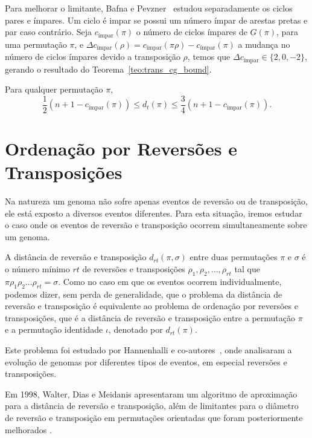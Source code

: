 Para melhorar o limitante, Bafna e Pevzner~\cite{BafnaPevzner*1998}
estudou separadamente os ciclos pares e ímpares. Um ciclo é impar se
possui um número ímpar de arestas pretas e par caso contrário. Seja
$c_{\text{ímpar}}(\pi)$ o número de ciclos ímpares de $G(\pi)$, para
uma permutação $\pi$, e $\Delta c_{\text{ímpar}} (\rho) =
c_{\text{ímpar}} (\pi \rho) - c_{\text{ímpar}} (\pi)$ a mudança no
número de ciclos ímpares devido a transposição $\rho$, temos que
$\Delta c_{\text{ímpar}} \in \{2, 0, -2\}$, gerando o resultado do
Teorema~\ref{teo:trans_cg_bound}.

\begin{teo} 
  \label{teo:trans_cg_bound} 
  Para qualquer permutação $\pi$, 
  \[ 
  \frac{1}{2}(n + 1 - c_{\text{ímpar}}(\pi)) \leq d_t(\pi) \leq \frac{3}{4} (n
  + 1 - c_{\text{ímpar}}(\pi)).
  \]
\end{teo}

\section{Ordenação por Reversões e Transposições}
\label{sec:rev_trans}
Na natureza um genoma não sofre apenas eventos de reversão ou de
transposição, ele está exposto a diversos eventos diferentes. Para
esta situação, iremos estudar o caso onde os eventos de reversão e
transposição ocorrem simultaneamente sobre um genoma.

A distância de reversão e transposição $d_{rt}(\pi, \sigma)$ entre
duas permutações $\pi$ e $\sigma$ é o número mínimo $rt$ de reversões
e transposições $\rho_{1}, \rho_{2}, \ldots, \rho_{rt}$ tal que
$\pi \rho_{1} \rho_{2} \ldots \rho_{rt} = \sigma$. Como no caso em que
os eventos ocorrem individualmente, podemos dizer, sem perda de
generalidade, que o problema da distância de reversão e transposição é
equivalente ao problema de ordenação por reversões e transposições,
que é a distância de reversão e transposição entre a permutação $\pi$ e a
permutação identidade $\iota$, denotado por $d_{rt}(\pi)$.

Este problema foi estudado por Hannenhalli e
co-autores~\cite{HannenhalliChappeyKooninPevzner*1995}, onde
analisaram a evolução de genomas por diferentes tipos de eventos, em
especial reversões e transposições. 

Em 1998, Walter, Dias e Meidanis \cite{WalterDiasMeidanis*1998}
apresentaram um algoritmo de aproximação para a distância de reversão
e transposição, além de limitantes para o diâmetro de reversão e
transposição em permutações orientadas que foram posteriormente
melhorados \cite{MeidanisWalterDias*2002}.

